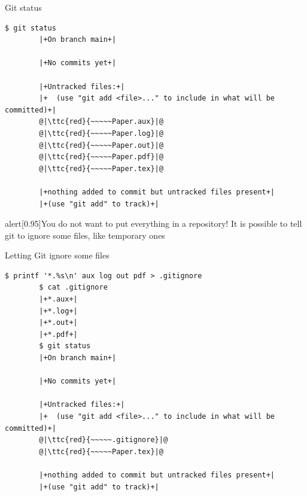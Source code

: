 \documentclass[usenames,svgnames,14pt]{beamer}
\newcommand{\ttc}[2]{\texttt{\textcolor{#1}{#2}}}
\begin{document}
\begin{frame}[fragile]{Git status}
    \begin{lstlisting}[style=MyBash]
        $ git status
        |+On branch main+|

        |+No commits yet+|

        |+Untracked files:+|
        |+  (use "git add <file>..." to include in what will be committed)+|
        @|\ttc{red}{~~~~~Paper.aux}|@
        @|\ttc{red}{~~~~~Paper.log}|@
        @|\ttc{red}{~~~~~Paper.out}|@
        @|\ttc{red}{~~~~~Paper.pdf}|@
        @|\ttc{red}{~~~~~Paper.tex}|@

        |+nothing added to commit but untracked files present+|
        |+(use "git add" to track)+|
    \end{lstlisting}
    \begin{varblock}{alert}[0.95\textwidth]{You do not want to put everything in a repository!}
        It is possible to tell git to ignore some files, like temporary ones
    \end{varblock}
\end{frame}
\begin{frame}[fragile]{Letting Git ignore some files}
    \begin{lstlisting}[style=MyBash]
        $ printf '*.%s\n' aux log out pdf > .gitignore
        $ cat .gitignore
        |+*.aux+|
        |+*.log+|
        |+*.out+|
        |+*.pdf+|
        $ git status
        |+On branch main+|

        |+No commits yet+|

        |+Untracked files:+|
        |+  (use "git add <file>..." to include in what will be committed)+|
        @|\ttc{red}{~~~~~.gitignore}|@
        @|\ttc{red}{~~~~~Paper.tex}|@

        |+nothing added to commit but untracked files present+|
        |+(use "git add" to track)+|
    \end{lstlisting}
    \begin{center}
        \qquad
    \end{center}
\end{frame}
\end{document}
